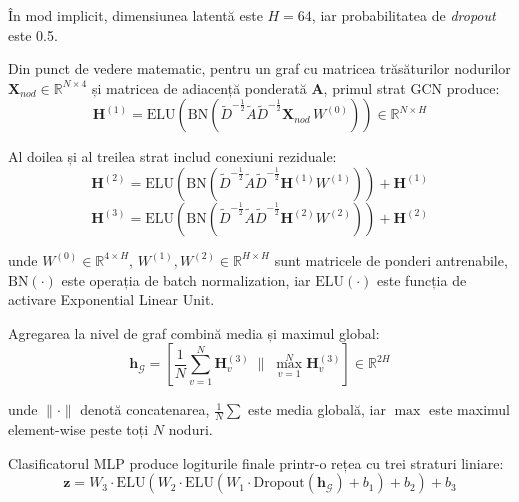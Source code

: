\documentclass[12pt,a4paper]{report}
\theoremstyle{definition}
\theoremstyle{remark}
\begin{document}
În mod implicit, dimensiunea latentă este $H = 64$, iar probabilitatea de \textit{dropout} este 0.5.

Din punct de vedere matematic, pentru un graf cu matricea trăsăturilor nodurilor $\mathbf{X}_{nod} \in \mathbb{R}^{N \times 4}$ și matricea de adiacență ponderată $\mathbf{A}$, primul strat GCN produce:
\begin{equation}
    \mathbf{H}^{(1)} = \text{ELU}\!\left(\text{BN}\!\left(\tilde{D}^{-\frac{1}{2}} \tilde{A} \tilde{D}^{-\frac{1}{2}} \mathbf{X}_{nod}\, W^{(0)}\right)\right) \in \mathbb{R}^{N \times H}
    \label{eq:gcn_layer1_impl}
\end{equation}

Al doilea și al treilea strat includ conexiuni reziduale:
\begin{equation}
    \mathbf{H}^{(2)} = \text{ELU}\!\left(\text{BN}\!\left(\tilde{D}^{-\frac{1}{2}} \tilde{A} \tilde{D}^{-\frac{1}{2}} \mathbf{H}^{(1)} W^{(1)}\right)\right) + \mathbf{H}^{(1)}
    \label{eq:gcn_layer2_impl}
\end{equation}
\begin{equation}
    \mathbf{H}^{(3)} = \text{ELU}\!\left(\text{BN}\!\left(\tilde{D}^{-\frac{1}{2}} \tilde{A} \tilde{D}^{-\frac{1}{2}} \mathbf{H}^{(2)} W^{(2)}\right)\right) + \mathbf{H}^{(2)}
    \label{eq:gcn_layer3_impl}
\end{equation}

\noindent unde $W^{(0)} \in \mathbb{R}^{4 \times H}$, $W^{(1)}, W^{(2)} \in \mathbb{R}^{H \times H}$ sunt matricele de ponderi antrenabile, $\text{BN}(\cdot)$ este operația de batch normalization, iar $\text{ELU}(\cdot)$ este funcția de activare Exponential Linear Unit.

Agregarea la nivel de graf combină media și maximul global:
\begin{equation}
    \mathbf{h}_{\mathcal{G}} = \left[\frac{1}{N}\sum_{v=1}^{N} \mathbf{H}^{(3)}_v \;\Big\|\; \max_{v=1}^{N} \mathbf{H}^{(3)}_v\right] \in \mathbb{R}^{2H}
    \label{eq:dual_pool}
\end{equation}

\noindent unde $\|\cdot\|$ denotă concatenarea, $\frac{1}{N}\sum$ este media globală, iar $\max$ este maximul element-wise peste toți $N$ noduri.

Clasificatorul MLP produce logiturile finale printr-o rețea cu trei straturi liniare:
\begin{equation}
    \mathbf{z} = W_3 \cdot \text{ELU}\!\left(W_2 \cdot \text{ELU}\!\left(W_1 \cdot \text{Dropout}(\mathbf{h}_{\mathcal{G}}) + b_1\right) + b_2\right) + b_3
    \label{eq:gcn_logits}
\end{equation}
\end{document}

